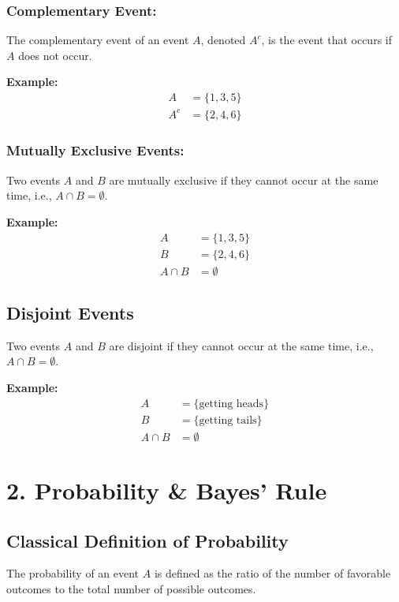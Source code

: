 \documentclass{article}
\begin{document}
\subsubsection*{Complementary Event:}
The complementary event of an event $A$, denoted $A^c$, is the event that occurs if $A$ does not occur.

\textbf{Example:}
\begin{align*}
    A &= \{1, 3, 5\} \\
    A^c &= \{2, 4, 6\}
\end{align*}


\subsubsection*{Mutually Exclusive Events:}
Two events $A$ and $B$ are mutually exclusive if they cannot occur at the same time, i.e., $A \cap B = \emptyset$.

\textbf{Example:}
\begin{align*}
    A &= \{1, 3, 5\} \\
    B &= \{2, 4, 6\} \\
    A \cap B &= \emptyset
\end{align*}

\subsection*{Disjoint Events}
Two events $A$ and $B$ are disjoint if they cannot occur at the same time, i.e., $A \cap B = \emptyset$.

\textbf{Example:}
\begin{align*}
    A &= \{\text{getting heads}\} \\
    B &= \{\text{getting tails}\} \\
    A \cap B &= \emptyset
\end{align*}


\section*{2. Probability \& Bayes' Rule}

\subsection*{Classical Definition of Probability}

The probability of an event $A$ is defined as the ratio of the number of favorable outcomes to the total number of possible outcomes.
\end{document}

